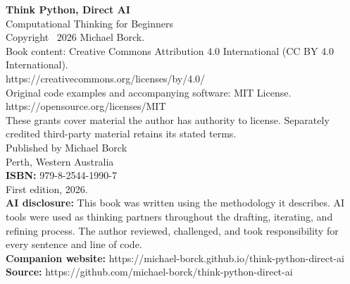 \thispagestyle{empty}
\vspace*{\fill}

\begin{flushleft}
\textbf{Think Python, Direct AI}\\
Computational Thinking for Beginners\\[1.5em]
Copyright \textcopyright\ 2026 Michael Borck.\\[1em]
Book content: Creative Commons Attribution 4.0 International (CC BY 4.0 International).\\
https://creativecommons.org/licenses/by/4.0/\\[0.5em]
Original code examples and accompanying software: MIT License.\\
https://opensource.org/licenses/MIT\\[0.5em]
These grants cover material the author has authority to license. Separately credited third-party material retains its stated terms.\\[1em]
Published by Michael Borck\\
Perth, Western Australia\\[1em]
\textbf{ISBN:} 979-8-2544-1990-7\\[1em]
First edition, 2026.\\[1em]
\textbf{AI disclosure:} This book was written using the methodology it describes. AI tools were used as thinking partners throughout the drafting, iterating, and refining process. The author reviewed, challenged, and took responsibility for every sentence and line of code.\\[1em]
\textbf{Companion website:} https://michael-borck.github.io/think-python-direct-ai\\
\textbf{Source:} https://github.com/michael-borck/think-python-direct-ai
\end{flushleft}

\vspace*{\fill}
\clearpage
